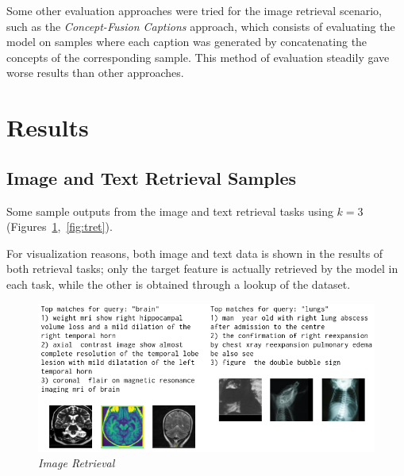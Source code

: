 \documentclass[10pt,twocolumn,letterpaper]{article}
\begin{document}
Some other evaluation approaches were tried for the image retrieval scenario, such as the \textit{Concept-Fusion Captions} approach, which consists of evaluating the model on samples where each caption was generated by concatenating the concepts of the corresponding sample.
This method of evaluation steadily gave worse results than other approaches.

\section{Results}

\subsection{Image and Text Retrieval Samples}
Some sample outputs from the image and text retrieval tasks using $k=3$ (Figures\ \ref{fig:iret},\ \ref{fig:tret}).

For visualization reasons, both image and text data is shown in the results of both retrieval tasks; only the target feature is actually retrieved by the model in each task, while the other is obtained through a lookup of the dataset.

%

\begin{figure}
   \centering
   \includegraphics[width=0.8\linewidth]{img/T2I_test_compact.png}
   \caption{\textit{Image Retrieval}}
   \label{fig:iret}
\end{figure}
\end{document}
